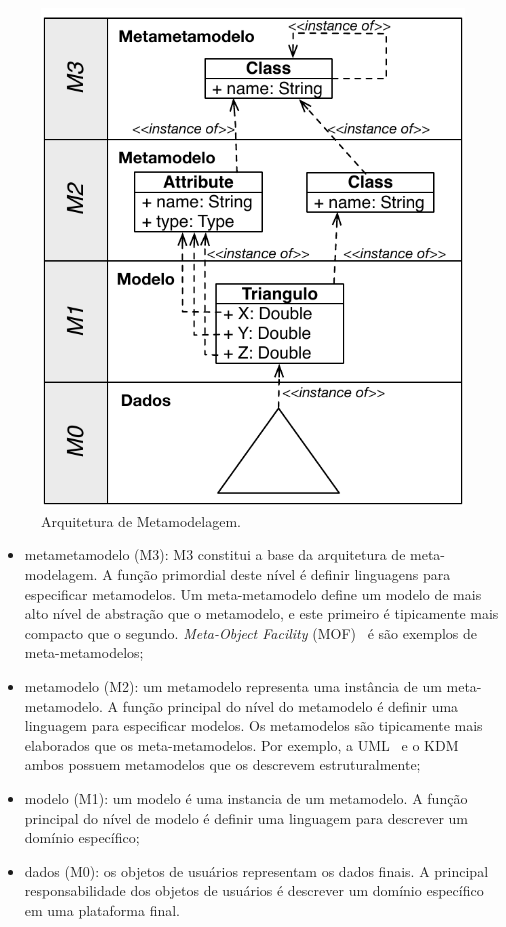 \begin{figure}[htb]
 \caption{Arquitetura de Metamodelagem.}
 \label{fig:metamodelosCamadas}
 \centering
 \includegraphics[scale=0.9]{images/Arquitetura_de_metamodelagem}
 \fautor
\end{figure}

\begin{itemize}
	\item metametamodelo (M3): M3 constitui a base da arquitetura de meta-modelagem. A função primordial deste nível é definir linguagens para especificar metamodelos. Um meta-metamodelo define um modelo de mais alto nível de abstração que o metamodelo, e este primeiro é tipicamente mais compacto que o segundo. \textit{Meta-Object Facility} (MOF)~\cite{MOF} é \cite{EMF} são exemplos de meta-metamodelos;
	\item metamodelo (M2): um metamodelo representa uma instância de um meta-metamodelo. A função principal do nível do metamodelo é definir uma linguagem para especificar modelos. Os metamodelos são tipicamente mais elaborados que os meta-metamodelos. Por exemplo, a UML~\cite{UML:OMG} e o KDM~\cite{KDM:ISO} ambos possuem metamodelos que os descrevem estruturalmente;
	\item modelo (M1): um modelo é uma instancia de um metamodelo. A função principal do nível de modelo é definir uma linguagem para descrever um domínio específico;
	\item dados (M0): os objetos de usuários representam os dados finais. A principal responsabilidade dos objetos de usuários é descrever um domínio específico em uma plataforma final.
\end{itemize}

